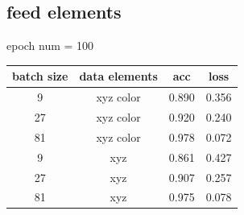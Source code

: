 \documentclass{article}
\begin{document}
\subsection{feed elements}
epoch num = 100
\begin{center}
	\begin{tabular}{|c | c || c c |} 
		\hline
		batch size & data elements & acc & loss \\
		\hline
		9 & xyz color & 0.890 & 0.356\\ [0.5ex] 
		\hline
		27 & xyz color & 0.920 & 0.240\\ [0.5ex] 
		\hline
		81 & xyz color & 0.978 & 0.072\\ [0.5ex] 
		\hline
		9 & xyz  & 0.861 & 0.427\\ [0.5ex] 
		\hline
		27 & xyz & 0.907 & 0.257\\ [0.5ex] 
		\hline
		81 & xyz & 0.975 & 0.078 \\  [1ex] 
		\hline
	\end{tabular}
\end{center}
\end{document}
